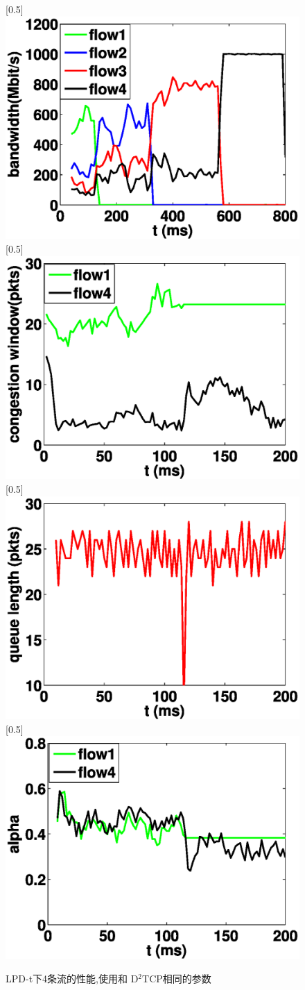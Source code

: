 \begin{figure}[h]
\setlength{\abovecaptionskip}{0pt} 
\setlength{\belowcaptionskip}{1pt} 
   [0.5\linewidth]  
    {\includegraphics[width=0.5\columnwidth]{figures/LPD/evaluation_1/LPD_bandwidth.eps}}
  [0.5\linewidth]  
      {\includegraphics[width=0.5\columnwidth]{figures/LPD/evaluation_1/LPD_window.eps}}
  [0.5\linewidth]  
    {\includegraphics[width=0.5\columnwidth]{figures/LPD/evaluation_1/LPD_queue.eps}}
  [0.5\linewidth]  
      {\includegraphics[width=0.5\columnwidth]{figures/LPD/evaluation_1/LPD_alpha.eps}}
  \caption{LPD-t下4条流的性能,使用和 D$^{2}$TCP相同的参数}
  \label{evalution_cases_fig}
\end{figure}



